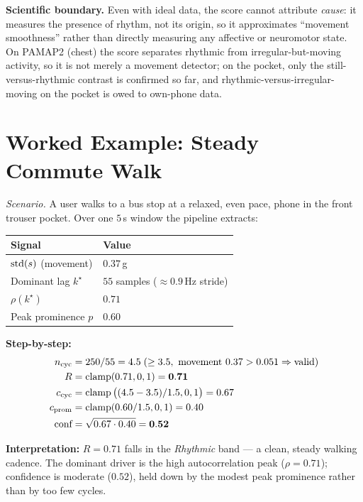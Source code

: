 \noindent\textbf{Scientific boundary.} Even with ideal data, the score cannot attribute
\emph{cause}: it measures the presence of rhythm, not its origin, so it approximates
``movement smoothness'' rather than directly measuring any affective or neuromotor state.
On PAMAP2 (chest) the score separates rhythmic from irregular-but-moving activity, so it is
not merely a movement detector; on the pocket, only the still-versus-rhythmic contrast is
confirmed so far, and rhythmic-versus-irregular-moving on the pocket is owed to own-phone data.

\section{Worked Example: Steady Commute Walk}

\noindent\textit{Scenario.} A user walks to a bus stop at a relaxed, even pace, phone in the
front trouser pocket. Over one $5$\,s window the pipeline extracts:

\begin{center}
\begin{tabular}{@{}ll@{}}
\toprule
\textbf{Signal} & \textbf{Value} \\
\midrule
$\operatorname{std}(s)$ (movement)        & $0.37$\,g \\
Dominant lag $k^\star$      & $55$ samples ($\approx 0.9$\,Hz stride) \\
$\rho(k^\star)$             & $0.71$ \\
Peak prominence $p$         & $0.60$ \\
\bottomrule
\end{tabular}
\end{center}

\noindent\textbf{Step-by-step:}
\begin{align*}
n_\text{cyc} &= 250/55 = 4.5 \;(\geq 3.5,\ \text{movement } 0.37>0.051 \Rightarrow \text{valid})\\
R            &= \operatorname{clamp}(0.71,0,1) = \mathbf{0.71}\\
c_\text{cyc} &= \operatorname{clamp}\big((4.5-3.5)/1.5,0,1\big) = 0.67\\
c_\text{prom}&= \operatorname{clamp}(0.60/1.5,0,1) = 0.40\\
\text{conf}  &= \sqrt{0.67\cdot 0.40} = \mathbf{0.52}
\end{align*}

\begin{callout}
\textbf{Interpretation:} $R = 0.71$ falls in the \emph{Rhythmic} band --- a clean, steady
walking cadence. The dominant driver is the high autocorrelation peak ($\rho=0.71$);
confidence is moderate ($0.52$), held down by the modest peak prominence rather than by
too few cycles.
\end{callout}

